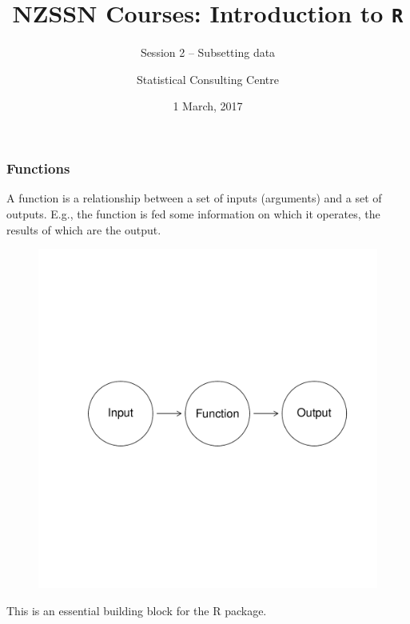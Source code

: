 \documentclass{beamer}\usepackage[]{graphicx}\usepackage[]{color}
\author[SCC]{Statistical Consulting Centre}%
\institute[\href{mailto:consulting@stat.auckland.ac.nz}
  {consulting@stat.auckland.ac.nz}]{\href{mailto:consulting@stat.auckland.ac.nz}
  {consulting@stat.auckland.ac.nz}\\
The Department of Statistics\\
The University of Auckland}
\title[Session 2 -- Subsetting data]{NZSSN Courses: Introduction to \texttt{R}}
\subtitle{Session 2 -- Subsetting data}
\date{1 March, 2017}
\begin{document}
\maketitle
\begin{frame}
\vspace{10pt}
  \frametitle{Functions}
  A function is a relationship between a set of inputs (arguments)
    and a set of outputs. E.g., the function is fed some information on which it
    operates, the results of which are the output.
    

\vspace{-60pt}
\begin{figure}[h]
  \centering
  \includegraphics[height = 0.9\textwidth, keepaspectratio]{Figure/fun1}
  \label{fig:fun1}
\end{figure}

This is an essential building block for the R package. 

\end{frame}
\end{document}

